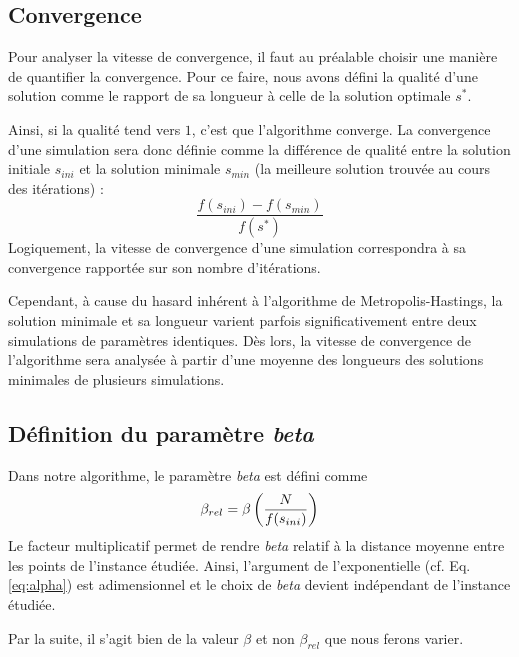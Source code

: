 \documentclass[a4paper, 12pt]{report}
\begin{document}
    \subsection{Convergence}
    Pour analyser la vitesse de convergence, il faut au préalable choisir une manière de quantifier la convergence. Pour ce faire, nous avons défini la qualité d'une solution comme le rapport de sa longueur à celle de la solution optimale $s^*$. \par
    Ainsi, si la qualité tend vers $1$, c'est que l'algorithme converge. La convergence d'une simulation sera donc définie comme la différence de qualité entre la solution initiale $s_{ini}$ et la solution minimale $s_{min}$ (la meilleure solution trouvée au cours des itérations) :
    \begin{equation}
        \frac{f(s_{ini}) - f(s_{min})}{f(s^*)}
    \end{equation}
    Logiquement, la vitesse de convergence d'une simulation correspondra à sa convergence rapportée sur son nombre d'itérations. \par
    Cependant, à cause du hasard inhérent à l'algorithme de Metropolis-Hastings, la solution minimale et sa longueur varient parfois significativement entre deux simulations de paramètres identiques. Dès lors, la vitesse de convergence de l'algorithme sera analysée à partir d'une moyenne des longueurs des solutions minimales de plusieurs simulations.
    \subsection{Définition du paramètre \emph{beta}}
    Dans notre algorithme, le paramètre \emph{beta} est défini comme
    \begin{equation*}
        \beta_{rel} = \beta\left(\frac{N}{f(s_{ini})}\right)
    \end{equation*}
    Le facteur multiplicatif permet de rendre \emph{beta} relatif à la distance moyenne entre les points de l'instance étudiée. Ainsi, l'argument de l'exponentielle (cf. Eq. \eqref{eq:alpha}) est adimensionnel et le choix de \emph{beta} devient indépendant de l'instance étudiée. \par
    Par la suite, il s'agit bien de la valeur $\beta$ et non $\beta_{rel}$ que nous ferons varier.
\end{document}
